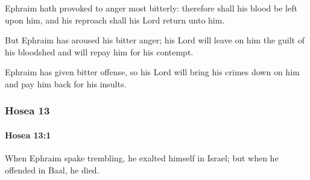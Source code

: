 			\begin{versebox}
					\item[BHS] 
					\item[LXX] 
					\item[ASV] Ephraim hath provoked to anger most bitterly: therefore shall his blood be left upon him, and his reproach shall his Lord return unto him.
					\item[NIV] But Ephraim has aroused his bitter anger; his Lord will leave on him the guilt of his bloodshed and will repay him for his contempt.
					\item[NRSV] Ephraim has given bitter offense, so his Lord will bring his crimes down on him and pay him back for his insults.
			\end{versebox}
	\subsubsection{Hosea 13} %
		\label{HOSEA-13}

		\paragraph{Hosea 13:1} %
			\label{HOSEA-13-1}

			When Ephraim spake trembling, he exalted himself in Israel; but when he offended in Baal, he died.

